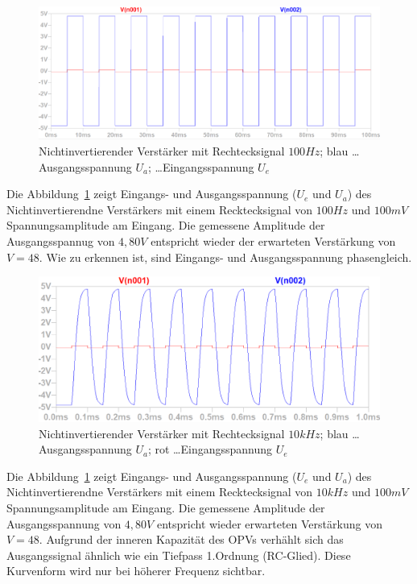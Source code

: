 \documentclass[12pt,a4paper,titlepage]{article}
\begin{document}
\begin{figure}[H]
  \centering
  \includegraphics[width=150mm]{nichtinvertierend_pulse_eingangs_ausgangsspannung}
  \caption{Nichtinvertierender Verst\"arker mit Rechtecksignal $100Hz$; blau \dots Ausgangsspannung $U_a$; \dots Eingangsspannung $U_e$}
  \label{figure03}
\end{figure}
Die Abbildung~\ref{figure03} zeigt Eingangs- und Ausgangsspannung ($U_e$ und $U_a$) des Nichtinvertierendne Verst\"arkers mit einem Recktecksignal von $100Hz$ und $100mV$ Spannungsamplitude am Eingang. Die gemessene Amplitude der Ausgangsspannug von $4,80V$ entspricht wieder der erwarteten Verst\"arkung von $V = 48$. Wie zu erkennen ist, sind Eingangs- und Ausgangsspannung phasengleich.

\begin{figure}[H]
  \centering
  \includegraphics[width=150mm]{nichtinvertierend_pulse2_eingangs_ausgangsspannung}
  \caption{Nichtinvertierender Verst\"arker mit Rechtecksignal $10kHz$; blau \dots Ausgangsspannung $U_a$; rot \dots Eingangsspannung $U_e$}
  \label{figure04}
\end{figure}
Die Abbildung~\ref{figure03} zeigt Eingangs- und Ausgangsspannung ($U_e$ und $U_a$) des Nichtinvertierendne Verst\"arkers mit einem Recktecksignal von $10kHz$ und $100mV$ Spannungsamplitude am Eingang. Die gemessene Amplitude der Ausgangsspannung von $4,80V$ entspricht wieder erwarteten Verst\"arkung von $V = 48$. Aufgrund der inneren Kapazit\"at des OPVs verh\"ahlt sich das Ausgangssignal \"ahnlich wie ein Tiefpass 1.Ordnung (RC-Glied). Diese Kurvenform wird nur bei h\"oherer Frequenz sichtbar.
\end{document}
